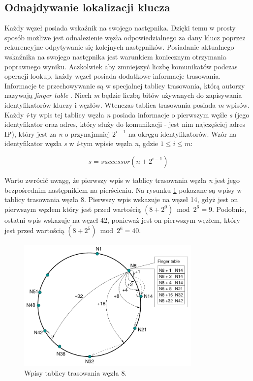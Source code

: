 \documentclass[12pt, twoside, openany]{report}
\begin{document}
\subsection{Odnajdywanie lokalizacji klucza}
\label{odnajdywanie_lokalizacji_klucza}

Każdy węzeł posiada wskaźnik na swojego następnika. Dzięki temu w prosty sposób możliwe jest odnalezienie węzła odpowiedzialnego za dany klucz poprzez rekurencyjne odpytywanie się kolejnych następników. Posiadanie aktualnego wskaźnika na swojego następnika jest warunkiem koniecznym otrzymania poprawnego wyniku. Aczkolwiek aby zmniejszyć liczbę komunikatów podczas operacji lookup, każdy węzeł posiada dodatkowe informacje trasowania. Informacje te przechowywanie są w specjalnej tablicy trasowania, którą autorzy nazywają \textit{finger table} \cite{bib:chord}. Niech \textit{m} będzie liczbą bitów używanych do zapisywania identyfikatorów kluczy i węzłów. Wtenczas tablica trasowania posiada \textit{m} wpisów. Każdy \textit{i}-ty wpis tej tablicy węzła \textit{n} posiada informacje o pierwszym węźle \textit{s} (jego identyfikator oraz adres, który służy do komunikacji - jest nim najczęściej adres IP), który jest za \textit{n} o przynajmniej $2^{i-1}$ na okręgu identyfikatorów. Wzór na identyfikator węzła \textit{s} w \textit{i}-tym wpisie węzła \textit{n}, gdzie $1\leq i \leq m$:

\begin{equation}
\label{eq:start}
s=successor(n+2^{i-1})
\end{equation}

Warto zwrócić uwagę, że pierwszy wpis w tablicy trasowania węzła \textit{n} jest jego bezpośrednim następnikiem na pierścieniu. Na rysunku \ref{fig:finger_table} pokazane są wpisy w tablicy trasowania węzła 8. Pierwszy wpis wskazuje na węzeł 14, gdyż jest on pierwszym węzłem który jest przed wartością $(8+2^0) \bmod 2^6=9$. Podobnie, ostatni wpis wskazuje na węzeł 42, ponieważ jest on pierwszym węzłem, który jest przed wartością $(8+2^5) \bmod 2^6=40$.

\begin{figure}[H]
\centering
\includegraphics[width=0.8\textwidth,height=\textheight,keepaspectratio]{finger_table.png}
\caption{Wpisy tablicy trasowania węzła 8.}
\label{fig:finger_table}
\end{figure}
\end{document}
